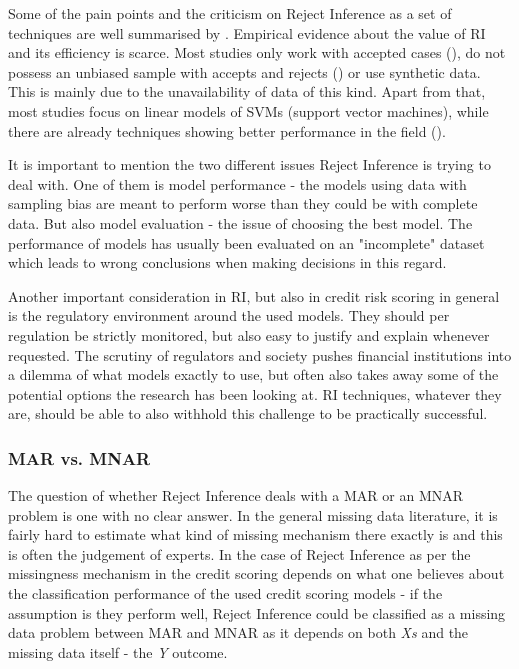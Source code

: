 \documentclass[11pt,a4paper]{article}
\begin{document}
Some of the pain points and the criticism on Reject Inference as a set of techniques are well summarised by \cite{kozodoi2020shallow}. Empirical evidence about the value of RI and its efficiency is scarce. Most studies only work with accepted cases (\cite{Banasik_Crook_2010}), do not possess an unbiased sample with accepts and rejects (\cite{Bücker_Van_Kampen_Krämer_2013}) or use synthetic data. This is mainly due to the unavailability of data of this kind. Apart from that, most studies focus on linear models of SVMs (support vector machines), while there are already techniques showing better performance in the field (\cite{Lessmann_Baesens_Seow_Thomas_2015}). 

It is important to mention the two different issues Reject Inference is trying to deal with. One of them is model performance - the models using data with sampling bias are meant to perform worse than they could be with complete data. But also model evaluation - the issue of choosing the best model. The performance of models has usually been evaluated on an "incomplete" dataset which leads to wrong conclusions when making decisions in this regard. 

Another important consideration in RI, but also in credit risk scoring in general is the regulatory environment around the used models. They should per regulation be strictly monitored, but also easy to justify and explain whenever requested. The scrutiny of regulators and society pushes financial institutions into a dilemma of what models exactly to use, but often also takes away some of the potential options the research has been looking at. RI techniques, whatever they are, should be able to also withhold this challenge to be practically successful.

\subsubsection{MAR vs. MNAR}
The question of whether Reject Inference deals with a MAR or an MNAR problem is one with no clear answer. In the general missing data literature, it is fairly hard to estimate what kind of missing mechanism there exactly is and this is often the judgement of experts. In the case of Reject Inference as per \cite{gongyuebound} the missingness mechanism in the credit scoring depends on what one believes about the classification performance of the used credit scoring models - if the assumption is they perform well, Reject Inference could be classified as a missing data problem between MAR and MNAR as it depends on both \textit{Xs} and the missing data itself - the \textit{Y} outcome. 
\end{document}
